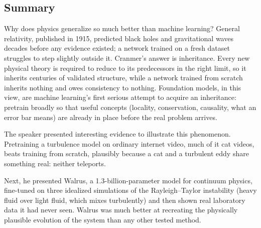 \documentclass[11pt]{article}
\begin{document}
\subsection*{Summary}
Why does physics generalize so much better than machine learning? General relativity, published in 1915, predicted black holes and gravitational waves decades before any evidence existed; a network trained on a fresh dataset struggles to step slightly outside it. Cranmer's answer is inheritance. Every new physical theory is required to reduce to its predecessors in the right limit, so it inherits centuries of validated structure, while a network trained from scratch inherits nothing and owes consistency to nothing. Foundation models, in this view, are machine learning's first serious attempt to acquire an inheritance: pretrain broadly so that useful concepts (locality, conservation, causality, what an error bar means) are already in place before the real problem arrives.

The speaker presented interesting evidence to illustrate this phenomenon. Pretraining a turbulence model on ordinary internet video, much of it cat videos, beats training from scratch, plausibly because a cat and a turbulent eddy share something real: neither teleports.

Next, he presented Walrus, a 1.3-billion-parameter model for continuum physics, fine-tuned on three idealized simulations of the Rayleigh--Taylor instability (heavy fluid over light fluid, which mixes turbulently) and then shown real laboratory data it had never seen. Walrus was much better at recreating the physically plausible evolution of the system than any other tested method.
\end{document}
